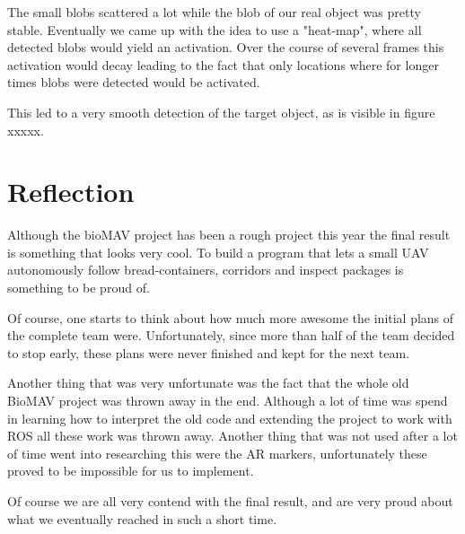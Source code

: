 \documentclass[a4paper,10pt]{article}
\begin{document}
The small blobs scattered a lot while the blob of our real object was pretty stable. 
Eventually we came up with the idea to use a "heat-map", where all detected blobs would yield an activation. 
Over the course of several frames this activation would decay leading to the fact that only locations where for longer times blobs were detected would be activated. 

This led to a very smooth detection of the target object, as is visible in figure xxxxx. 

\section{Reflection}

Although the bioMAV project has been a rough project this year the final result is something that looks very cool. 
To build a program that lets a small UAV autonomously follow bread-containers, corridors and inspect packages is something to be proud of. 

Of course, one starts to think about how much more awesome the initial plans of the complete team were. 
Unfortunately, since more than half of the team decided to stop early, these plans were never finished and kept for the next team. 

Another thing that was very unfortunate was the fact that the whole old BioMAV project was thrown away in the end. 
Although a lot of time was spend in learning how to interpret the old code and extending the project to work with ROS all these work was thrown away. 
Another thing that was not used after a lot of time went into researching this were the AR markers, unfortunately these proved to be impossible for us to implement. 

Of course we are all very contend with the final result, and are very proud about what we eventually reached in such a short time. 




\end{document}
